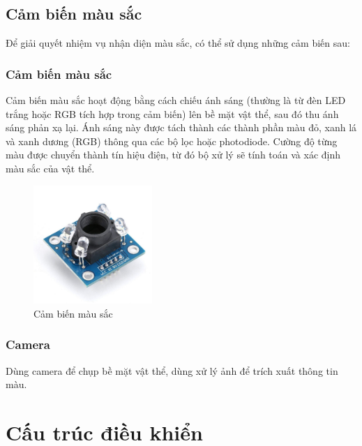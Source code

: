         \subsection{Cảm biến màu sắc}
            \hspace*{0.6cm}Để giải quyết nhiệm vụ nhận diện màu sắc, có thể sử dụng những cảm biến sau:
            \subsubsection{Cảm biến màu sắc}
                \hspace*{0.6cm} Cảm biến màu sắc hoạt động bằng cách chiếu ánh sáng (thường là từ đèn LED trắng hoặc RGB tích hợp trong cảm biến) lên bề mặt vật thể, 
                sau đó thu ánh sáng phản xạ lại. Ánh sáng này được tách thành các thành phần màu đỏ, xanh lá và xanh dương (RGB) thông 
                qua các bộ lọc hoặc photodiode. Cường độ từng màu được chuyển thành tín hiệu điện, từ đó bộ xử lý sẽ tính toán và xác định màu sắc của vật thể.
                \begin{figure}[H]
                    \centering
                    \includegraphics[width=0.4\textwidth]{pictures/chapter1/chapter1_pic18_color_sensor.png}
                    \caption{Cảm biến màu sắc}
                    \label{chap1_pic18}
                \end{figure}    
            \subsubsection{Camera}
                \hspace*{0.6cm}Dùng camera để chụp bề mặt vật thể, dùng xử lý ảnh để trích xuất thông tin màu.

    \section{Cấu trúc điều khiển}
